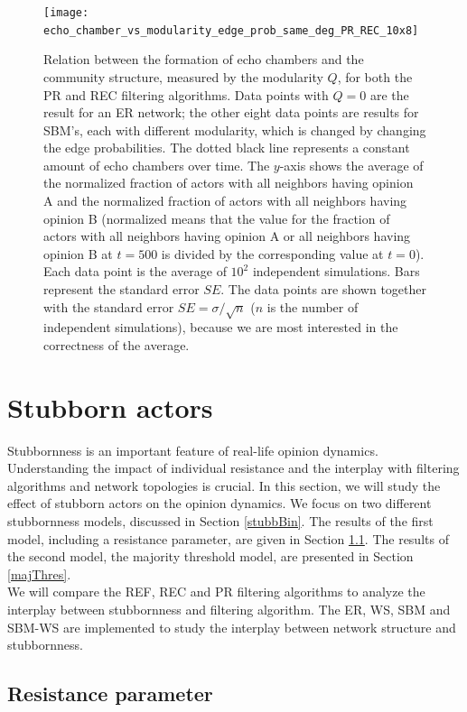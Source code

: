 \documentclass[11 pt , letterpaper , twoside , openright]{book}
\begin{document}
\begin{figure}[H]
	\texttt{[image: echo\_chamber\_vs\_modularity\_edge\_prob\_same\_deg\_PR\_REC\_10x8]}
	\captionsetup{format=plain}
	\caption[Relation between the formation of echo chambers and community structure (modularity $Q$).]{Relation between the formation of echo chambers and the community structure, measured by the modularity $Q$, for both the PR and REC filtering algorithms. Data points with $Q = 0$ are the result for an ER network; the other eight data points are results for SBM's, each with different modularity, which is changed by changing the edge probabilities. The dotted black line represents a constant amount of echo chambers over time. The $y$-axis shows the average of the normalized fraction of actors with all neighbors having opinion A and the normalized fraction of actors with all neighbors having opinion B  (normalized means that the value for the fraction of actors with all neighbors having opinion A or all neighbors having opinion B at $t=500$ is divided by the corresponding value at $t=0$). Each data point is the average of $10^2$ independent simulations. Bars represent the standard error $SE$. The data points are shown together with the standard error $SE = \sigma /\sqrt{n}$ ($n$ is the number of independent simulations), because we are most interested in the correctness of the average.}
\label{echo_vs_mod}
\end{figure}
\noindent
\section{Stubborn actors}

Stubbornness is an important feature of real-life opinion dynamics. Understanding the impact of individual resistance and the interplay with filtering algorithms and network topologies is crucial. In this section, we will study the effect of stubborn actors on the opinion dynamics. We focus on two different stubbornness models, discussed in Section \ref{stubbBin}. The results of the first model, including a resistance parameter, are given in Section \ref{stubbpar}. The results of the second model, the majority threshold model, are presented in Section \ref{majThres}.\\
\newline
We will compare the REF, REC and PR filtering algorithms to analyze the interplay between stubbornness and filtering algorithm. The ER, WS, SBM and SBM-WS are implemented to study the interplay between network structure and stubbornness.
\newpage
\subsection{Resistance parameter}
\label{stubbpar}
\end{document}
